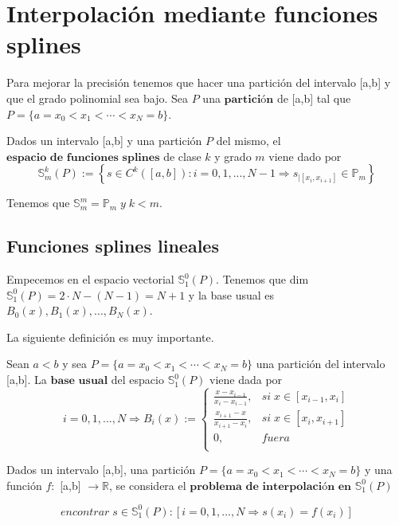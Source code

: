 \section{Interpolación mediante funciones splines}
Para mejorar la precisión tenemos que hacer una partición del intervalo [a,b] y que el grado polinomial sea bajo. Sea $P$ una $\textbf{partición}$ de [a,b] tal que $P = \lbrace a=x_0 < x_1 < \cdots < x_N = b\rbrace$.

\begin{ndef}
Dados un intervalo [a,b] y una partición $P$ del mismo, el $\textbf{espacio de funciones splines}$ de clase $k$ y grado $m$ viene dado por
\[ \mathbb{S}_m^k(P) := \left\lbrace s \in C^k ( \left[ a,b \right] ) : i=0,1,...,N-1 \Rightarrow s_{\vert \left[ x_i, x_{i+1} \right]} \in \mathbb{P} _m \right\rbrace \]
\end{ndef}

Tenemos que $\mathbb{S}_m^m = \mathbb{P}_m \; y \; k<m$.

\subsection{Funciones splines lineales}
Empecemos en el espacio vectorial $\mathbb{S}_1^0(P)$. Tenemos que dim$\mathbb{S}_1^0(P) = 2\cdot N-(N-1) = N+1$ y la base usual es {$B_0(x),B_1(x),...,B_N(x)$}.

La siguiente definición es muy importante.

\begin{ndef}
Sean $a<b$ y sea $P = \lbrace a=x_0 < x_1 < \cdots < x_N = b\rbrace$ una partición del intervalo [a,b]. La $\textbf{base usual}$ del espacio $\mathbb{S}_1^0(P)$ viene dada por
\[ i=0,1,...,N \Rightarrow B_i(x) := \left\lbrace
\begin{array}{ll}
\frac{x-x_{i-1}}{x_i-x_{i-1}}, & si \; x \in \left[ x_{i-1},x_i \right] \\
\frac{x_{i+1}-x}{x_{i+1}-x_i}, & si \; x \in \left[ x_i,x_{i+1} \right] \\
0, & fuera \\
\end{array}
\right.
\]
\end{ndef}

Dados un intervalo [a,b], una partición $P = \lbrace a=x_0 < x_1 < \cdots < x_N = b\rbrace$ y una función $f:$ [a,b] $\longrightarrow \mathbb{R}$, se considera el $\textbf{problema de interpolación en}$ $\mathbb{S}_1^0(P)$

\[encontrar \; s \in \mathbb{S}_1^0(P) : \left[ i=0,1,...,N \Rightarrow s(x_i) = f(x_i) \right] \]

